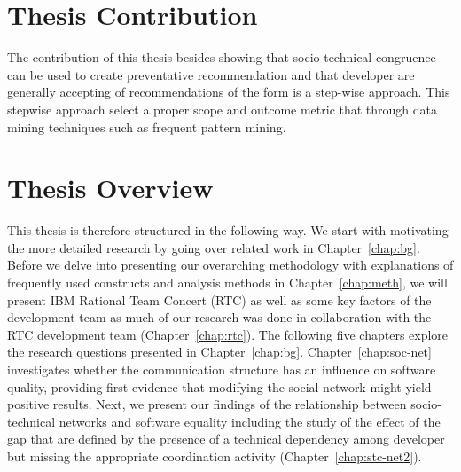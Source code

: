 \section{Thesis Contribution}
The contribution of this thesis besides showing that socio-technical congruence can be used to create preventative recommendation and that developer are generally accepting of recommendations of the form is a step-wise approach.
This stepwise approach select a proper scope and outcome metric that through data mining techniques such as frequent pattern mining.


\section{Thesis Overview}
This thesis is therefore structured in the following way.
We start with motivating the more detailed research by going over related work in Chapter~\ref{chap:bg}.
Before we delve into presenting our overarching methodology with explanations of frequently used constructs and analysis methods in Chapter~\ref{chap:meth}, we will present IBM Rational Team Concert (RTC) as well as some key factors of the development team as much of our research was done in collaboration with the RTC development team (Chapter~\ref{chap:rtc}).
The following five chapters explore the research questions presented in Chapter~\ref{chap:bg}.
Chapter~\ref{chap:soc-net} investigates whether the communication structure has an influence on software quality, providing first evidence that modifying the social-network might yield positive results.
Next, we present our findings of the relationship between socio-technical networks and software equality including the study of the effect of the gap that are defined by the presence of a technical dependency among developer but missing the appropriate coordination activity (Chapter~\ref{chap:stc-net2}).

